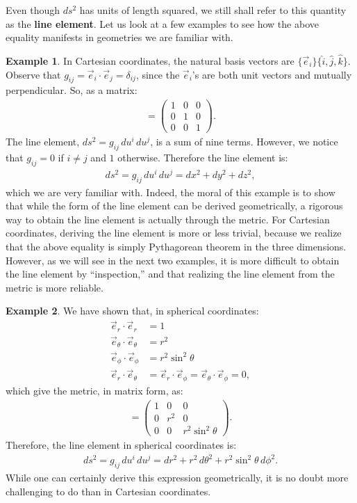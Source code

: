 \documentclass{article}
\theoremstyle{definition}
\newtheorem{exmp}{Example}[section]
\begin{document}
Even though $ds^2$ has units of length squared, we still shall refer to this quantity as the \textbf{line element}. Let us look at a few examples to see how the above equality manifests in geometries we are familiar with.
\begin{exmp}
In Cartesian coordinates, the natural basis vectors are $\{\vec{e}_i\} \{ \hat{i}, \hat{j}, \hat{k}\}$. Observe that $g_{ij} = \vec{e}_i \cdot \vec{e}_j = \delta_{ij}$, since the $\vec{e}_i$'s are both unit vectors and mutually perpendicular. So, as a matrix:
\begin{align*}
[g_{ij}] = 
\begin{pmatrix}
1 & 0 & 0\\
0 & 1 & 0\\
0 & 0 & 1
\end{pmatrix}.
\end{align*}
The line element, $ds^2 = g_{ij}\,du^i\,du^j$, is a sum of nine terms. However, we notice that $g_{ij} = 0 $ if $i\neq j$ and $1$ otherwise. Therefore the line element is:
\begin{align*}
ds^2 = g_{ij}\,du^i\,du^j = dx^2+dy^2+dz^2,
\end{align*}
which we are very familiar with. Indeed, the moral of this example is to show that while the form of the line element can be derived geometrically, a rigorous way to obtain the line element is actually through the metric. For Cartesian coordinates, deriving the line element is more or less trivial, because we realize that the above equality is simply Pythagorean theorem in the three dimensions. However, as we will see in the next two examples, it is more difficult to obtain the line element by ``inspection,'' and that realizing the line element from the metric is more reliable.   
\end{exmp}
\begin{exmp}
We have shown that, in spherical coordinates:
\begin{align*}
\vec{e}_r\cdot\vec{e}_r &= 1\\
\vec{e}_\theta\cdot\vec{e}_\theta &= r^2\\
\vec{e}_\phi\cdot\vec{e}_\phi &= r^2\sin^2\theta\\
\vec{e}_r\cdot\vec{e}_\theta &= \vec{e}_r\cdot\vec{e}_\phi = \vec{e}_\theta\cdot\vec{e}_\phi = 0, 
\end{align*}
which give the metric, in matrix form, as:
\begin{align*}
[g_{ij}] = 
\begin{pmatrix}
1 & 0 & 0\\
0 & r^2 & 0 \\
0 & 0 & r^2\sin^2\theta
\end{pmatrix}.
\end{align*}
Therefore, the line element in spherical coordinates is:
\begin{align*}
ds^2 = g_{ij}\,du^i\,du^j = dr^2 + r^2\,d\theta^2 + r^2\sin^2\theta\,d\phi^2.
\end{align*}
While one can certainly derive this expression geometrically, it is no doubt more challenging to do than in Cartesian coordinates.
\end{exmp}
\end{document}
